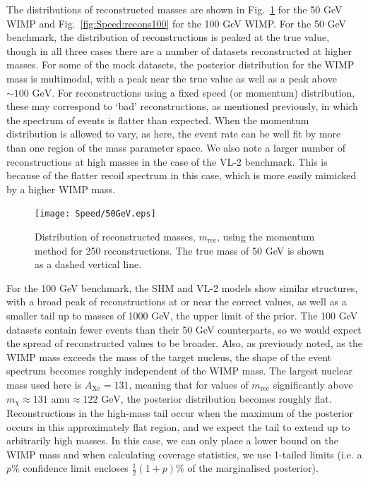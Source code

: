 The distributions of reconstructed masses are shown in Fig.\ \ref{fig:Speed:recons50} for the 50 GeV WIMP and Fig.\ \ref{fig:Speed:recons100} for the 100 GeV WIMP. For the 50 GeV benchmark, the distribution of reconstructions is peaked at the true value, though in all three cases there are a number of datasets reconstructed at higher masses. For some of the mock datasets, the posterior distribution for the WIMP mass is multimodal, with a peak near the true value as well as a peak above \(\sim 100 \textrm{ GeV}\). For reconstructions using a fixed speed (or momentum) distribution, these may correspond to `bad' reconstructions, as mentioned previously, in which the spectrum of events is flatter than expected. When the momentum distribution is allowed to vary, as here, the event rate can be well fit by more than one region of the mass parameter space.  We also note a larger number of reconstructions at high masses in the case of the VL-2 benchmark. This is because of the flatter recoil spectrum in this case, which is more easily mimicked by a higher WIMP mass.

 \begin{figure}[t]
\centering
\texttt{[image: Speed/50GeV.eps]}
\caption[Distribution of reconstructed masses using the binned momentum distribution for a 50 GeV WIMP with SHM, SHM+DD and VL2 distribution functions]{Distribution of reconstructed masses, \(m_\textrm{rec}\), using the momentum method for 250 reconstructions. The true mass of 50 GeV is shown as a dashed vertical line.}
  \label{fig:Speed:recons50}
\end{figure}



For the 100 GeV benchmark, the SHM and VL-2 models show similar structures, with a broad peak of reconstructions at or near the correct values, as well as a smaller tail up to masses of 1000 GeV, the upper limit of the prior. The 100 GeV datasets contain fewer events than their 50 GeV counterparts, so we would expect the spread of reconstructed values to be broader. Also, as previously noted, as the WIMP mass exceeds the mass of the target nucleus, the shape of the event spectrum becomes roughly independent of the WIMP mass. The largest nuclear mass used here is \(A_\textrm{Xe} = 131\), meaning that for values of \(m_\textrm{rec}\) significantly above \(m_\chi \approx 131 \textrm{ amu} \approx 122 \textrm{ GeV}\), the posterior distribution becomes roughly flat. Reconstructions in the high-mass tail occur when the maximum of the posterior occurs in this approximately flat region, and we expect the tail to extend up to arbitrarily high masses. In this case, we can only place a lower bound on the WIMP mass and when calculating coverage statistics, we use 1-tailed limits (i.e. a \(p\%\) confidence limit encloses \(\frac{1}{2}(1+p) \%\) of the marginalised posterior).

